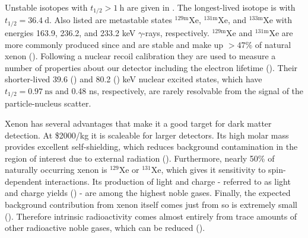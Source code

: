 Unstable isotopes with $t_{1/2} > 1\ \mathrm{h}$ are given in .  The longest-lived isotope is
 with $t_{1/2} = 36.4\ \mathrm{d}$.  Also listed are metastable states $\mathrm{^{129m}Xe}$, $\mathrm{^{131m}Xe}$, and
$\mathrm{^{133m}Xe}$ with energies 163.9, 236.2, and 233.2 keV $\gamma$-rays, respectively.  $\mathrm{^{129m}Xe}$ and $\mathrm{^{131m}Xe}$
are more commonly produced since  and  are stable and make up $> 47\%$ of natural xenon
().  Following a nuclear recoil calibration they are used to measure a number of properties about our detector
including the electron lifetime ().  Their shorter-lived 39.6
() and 80.2 () keV nuclear
excited states, which have $t_{1/2} = 0.97\ \mathrm{ns}$ and 0.48 ns, respectively, are rarely resolvable from the signal of the
particle-nucleus scatter.

Xenon has several advantages that make it a good target for dark matter detection.  At \$2000/kg it is scaleable for larger
detectors.  Its high molar mass provides excellent self-shielding, which reduces background contamination in the region of interest due to
external radiation
().  Furthermore, nearly 50\% of naturally occurring xenon is $^{129}$Xe or $^{131}$Xe,
which gives it sensitivity to spin-dependent interactions.  Its production of light and charge - referred to as light and charge yields
() - are among the highest noble gases.  Finally, the expected background contribution
from xenon itself comes just from  so is extremely small ().  Therefore
intrinsic radioactivity comes almost entirely from trace amounts of other radioactive noble gases, which can be reduced
().


